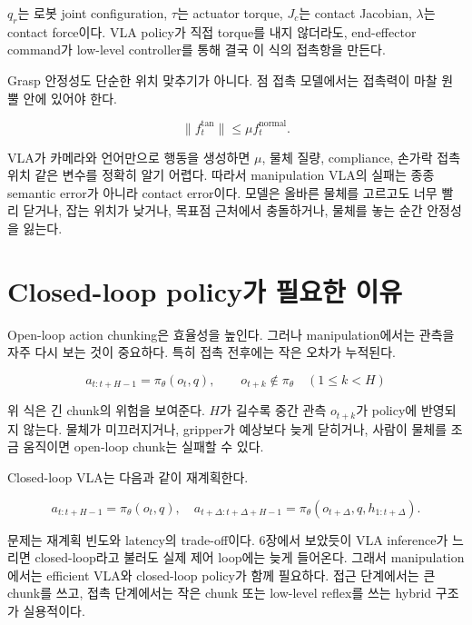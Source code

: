 $q_r$는 로봇 joint configuration, $\tau$는 actuator torque, $J_c$는 contact Jacobian, $\lambda$는 contact force이다. VLA policy가 직접 torque를 내지 않더라도, end-effector command가 low-level controller를 통해 결국 이 식의 접촉항을 만든다.

Grasp 안정성도 단순한 위치 맞추기가 아니다. 점 접촉 모델에서는 접촉력이 마찰 원뿔 안에 있어야 한다.

\begin{equation}
  \| f_t^{\mathrm{tan}} \|
  \le
  \mu f_t^{\mathrm{normal}}.
\end{equation}

VLA가 카메라와 언어만으로 행동을 생성하면 $\mu$, 물체 질량, compliance, 손가락 접촉 위치 같은 변수를 정확히 알기 어렵다. 따라서 manipulation VLA의 실패는 종종 semantic error가 아니라 contact error이다. 모델은 올바른 물체를 고르고도 너무 빨리 닫거나, 잡는 위치가 낮거나, 목표점 근처에서 충돌하거나, 물체를 놓는 순간 안정성을 잃는다.

\section{Closed-loop policy가 필요한 이유}

Open-loop action chunking은 효율성을 높인다. 그러나 manipulation에서는 관측을 자주 다시 보는 것이 중요하다. 특히 접촉 전후에는 작은 오차가 누적된다.

\begin{equation}
  a_{t:t+H-1}
  =
  \pi_\theta(o_t, q),
  \qquad
  o_{t+k} \not\in \pi_\theta
  \quad (1 \le k < H)
\end{equation}

위 식은 긴 chunk의 위험을 보여준다. $H$가 길수록 중간 관측 $o_{t+k}$가 policy에 반영되지 않는다. 물체가 미끄러지거나, gripper가 예상보다 늦게 닫히거나, 사람이 물체를 조금 움직이면 open-loop chunk는 실패할 수 있다.

Closed-loop VLA는 다음과 같이 재계획한다.

\begin{equation}
  a_{t:t+H-1}
  =
  \pi_\theta(o_t, q),
  \quad
  a_{t+\Delta:t+\Delta+H-1}
  =
  \pi_\theta(o_{t+\Delta}, q, h_{1:t+\Delta}).
\end{equation}

문제는 재계획 빈도와 latency의 trade-off이다. 6장에서 보았듯이 VLA inference가 느리면 closed-loop라고 불러도 실제 제어 loop에는 늦게 들어온다. 그래서 manipulation에서는 efficient VLA와 closed-loop policy가 함께 필요하다. 접근 단계에서는 큰 chunk를 쓰고, 접촉 단계에서는 작은 chunk 또는 low-level reflex를 쓰는 hybrid 구조가 실용적이다.

